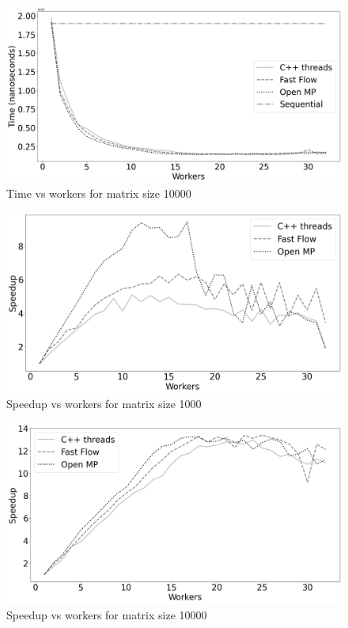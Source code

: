 \documentclass[12pt]{article}
\begin{document}
	\begin{figure}[H]
		\centering
		\includegraphics[width=13cm]{./images/time_vs_cores_10000}
		\caption{Time vs workers for matrix size 10000}
	\end{figure}

	\begin{figure}[H]
		\centering
		\includegraphics[width=13cm]{./images/speedup_vs_cores_1000}
		\caption{Speedup vs workers for matrix size 1000}
	\end{figure}

	\begin{figure}[H]
		\centering
		\includegraphics[width=13cm]{./images/speedup_vs_cores_10000}
		\caption{Speedup vs workers for matrix size 10000}
	\end{figure}
\end{document}
